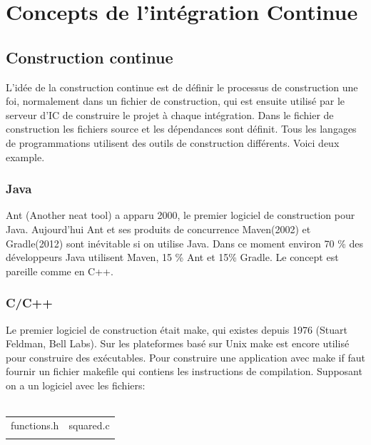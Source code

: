 \section{Concepts de l'intégration Continue}

\subsection{Construction continue}
L'idée de la construction continue est de définir le processus de construction une foi, normalement dans un fichier de construction, qui est ensuite utilisé par le serveur d'IC de construire le projet à chaque intégration. Dans le fichier de construction les fichiers source et les dépendances sont définit. Tous les langages de programmations utilisent des outils de construction différents. Voici deux example.

\subsubsection{Java}
Ant (Another neat tool) a apparu 2000, le premier logiciel de construction pour Java.
Aujourd'hui Ant et ses produits de concurrence Maven(2002) et Gradle(2012) sont inévitable si on utilise Java.
Dans ce moment environ 70 \% des développeurs Java utilisent Maven, 15 \% Ant et 15\% Gradle. Le concept est pareille comme en C++. 
\subsubsection{C/C++}
Le premier logiciel de construction était make, qui existes depuis 1976 (Stuart Feldman, Bell Labs). Sur les plateformes basé sur Unix make est encore utilisé pour construire des exécutables.
Pour construire une application avec make if faut fournir un fichier makefile qui contiens les instructions de compilation. Supposant on a un logiciel avec les fichiers: \\ \\

\begin{tabular}{ll}
functions.h&squared.c\\
{}&{}\\
\end{tabular}


